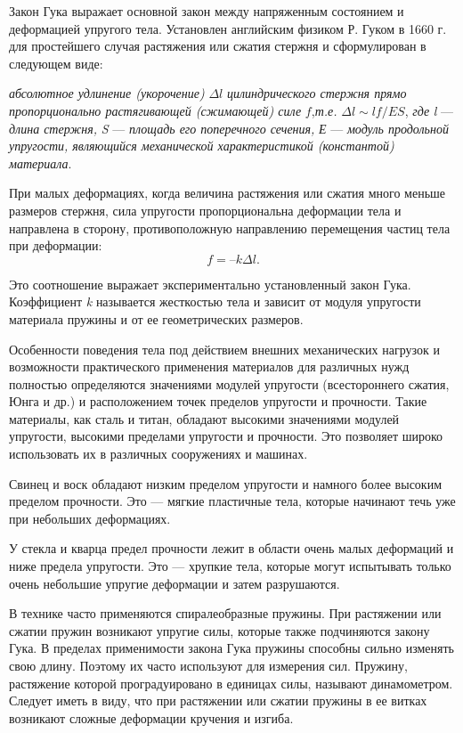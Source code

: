 \documentclass[All.tex]{subfiles}
\begin{document}
Закон Гука выражает основной закон между напряженным состоянием и деформацией упругого тела. 
Установлен английским физиком Р. Гуком в 1660 г. для простейшего случая растяжения или сжатия стержня и сформулирован в следующем виде:
 
\begin{flushleft}
	\textit{абсолютное удлинение (укорочение)} $ \Delta l $ \textit{цилиндрического стержня прямо пропорционально растягивающей (сжимающей) силе} $ f $,\textit{т.е.} $ \Delta l \sim lf/ES$, \textit{где} \textit{l} — \textit{длина стержня,} \textit{S} — \textit{площадь его поперечного сечения,} \textit{Е} — \textit{модуль продольной упругости, являющийся механической характеристикой (константой) материала}. 
\end{flushleft}

При малых деформациях, когда величина растяжения или сжатия много меньше размеров стержня, сила упругости пропорциональна деформации тела и направлена в сторону, противоположную направлению перемещения частиц тела при деформации: 
\begin{equation}\label{Hooke-1eq1}
f = –k\Delta l.
\end{equation}

Это соотношение выражает экспериментально установленный закон Гука. 
Коэффициент \textit{k} называется жесткостью тела и зависит от модуля упругости материала пружины и от ее 
геометрических размеров. 

Особенности поведения тела под действием внешних механических нагрузок и возможности практического применения материалов для различных нужд полностью определяются значениями 
модулей упругости (всестороннего сжатия, Юнга и др.) и расположением точек пределов упругости и прочности. 
Такие материалы, как сталь и титан, обладают высокими значениями модулей упругости, высокими пределами упругости и прочности.
Это позволяет широко использовать их в различных сооружениях и машинах. 

Свинец и воск обладают низким пределом упругости и намного 
более высоким пределом прочности.
Это — мягкие пластичные тела, которые начинают течь уже при небольших деформациях. 

У стекла и кварца предел прочности лежит в области очень малых деформаций и ниже предела упругости.
Это — хрупкие тела, которые могут испытывать только очень небольшие упругие деформации и затем разрушаются. 

В технике часто применяются спиралеобразные пружины.
При растяжении или сжатии пружин возникают упругие силы, которые также подчиняются закону Гука.
В пределах применимости закона Гука пружины способны сильно изменять свою длину.
Поэтому их часто используют для измерения сил. 
Пружину, растяжение которой проградуировано в единицах силы, называют динамометром.
Следует иметь в виду, что при растяжении или сжатии пружины в ее витках возникают сложные деформации кручения и изгиба.
\end{document}
